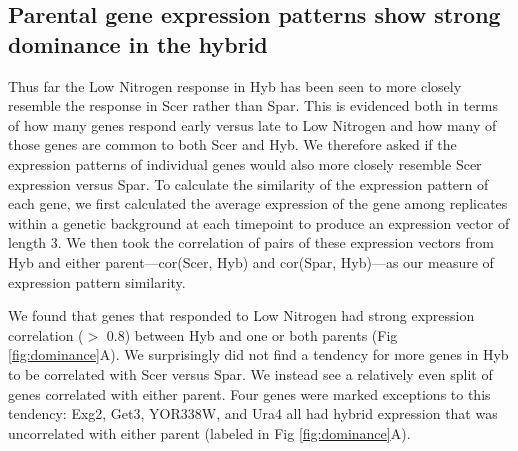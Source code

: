 \subsection{Parental gene expression patterns show strong dominance in the hybrid}

Thus far the Low Nitrogen response in Hyb has been seen to more closely resemble the response in Scer rather than Spar. This is evidenced both in terms of how many genes respond early versus late to Low Nitrogen and how many of those genes are common to both Scer and Hyb. We therefore asked if the expression patterns of individual genes would also more closely resemble Scer expression versus Spar. To calculate the similarity of the expression pattern of each gene, we first calculated the average expression of the gene among replicates within a genetic background at each timepoint to produce an expression vector of length 3. We then took the correlation of pairs of these expression vectors from Hyb and either parent---cor(Scer, Hyb) and cor(Spar, Hyb)---as our measure of expression pattern similarity.

\begin{SCfigure}
    \caption{\textbf{Hybrid expression tends to be strongly correlated with at least one parental species}. A) Correlation of hybrid expression vector (averaged expression among replicates at each timepoint) with the expression vectors of each parent. Only genes that responded to Low Nitrogen in at least one background are included. B) Same correlations as A, now including genes that were not considered responsive to Low Nitrogen but excluding genes that were highly correlated with both parents (cor(Scer, Hyb) $>=$ 0.8 and/or cor(Spar, Hyb) $>=$ 0.8). B') Inset of B for genes that were highly correlated with both parents (cor(Scer, Hyb) $>=$ 0.8 and/or cor(Spar, Hyb) $>=$ 0.8.}
    \label{fig:dominance}
\end{SCfigure}

We found that genes that responded to Low Nitrogen had strong expression correlation ($>$ 0.8) between Hyb and one or both parents (Fig \ref{fig:dominance}A). We surprisingly did not find a tendency for more genes in Hyb to be correlated with Scer versus Spar. We instead see a relatively even split of genes correlated with either parent. Four genes were marked exceptions to this tendency: Exg2, Get3, YOR338W, and Ura4 all had hybrid expression that was uncorrelated with either parent (labeled in Fig \ref{fig:dominance}A). 

